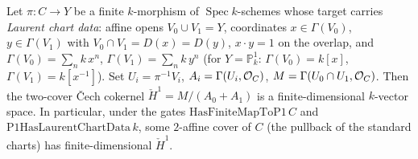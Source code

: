 \begin{theorem}
  \label{thm:adelic_finiteDimensional_cokernel_zero}
  \leanok
  Let \(\pi \colon C \to Y\) be a finite \(k\)-morphism of
  \(\operatorname{Spec} k\)-schemes whose target carries \emph{Laurent
  chart data}: affine opens \(V_0 \cup V_1 = Y\), coordinates
  \(x \in \Gamma(V_0)\), \(y \in \Gamma(V_1)\) with
  \(V_0 \cap V_1 = D(x) = D(y)\), \(x \cdot y = 1\) on the overlap, and
  \(\Gamma(V_0) = \sum_n k\, x^n\), \(\Gamma(V_1) = \sum_n k\, y^n\) (for
  \(Y = \mathbb{P}^1_k\): \(\Gamma(V_0) = k[x]\),
  \(\Gamma(V_1) = k[x^{-1}]\)). Set \(U_i = \pi^{-1} V_i\),
  \(A_i = \Gamma(U_i, \mathcal{O}_{C})\),
  \(M = \Gamma(U_0 \cap U_1, \mathcal{O}_{C})\). Then the two-cover Čech
  cokernel \(\check{H}^1 = M/(A_0 + A_1)\) is a finite-dimensional
  \(k\)-vector space. In particular, under the gates
  \(\mathrm{HasFiniteMapToP1}\, C\) and \(\mathrm{P1HasLaurentChartData}\,
  k\), some \(2\)-affine cover of \(C\) (the pullback of the standard
  charts) has finite-dimensional \(\check{H}^1\).
\end{theorem}
